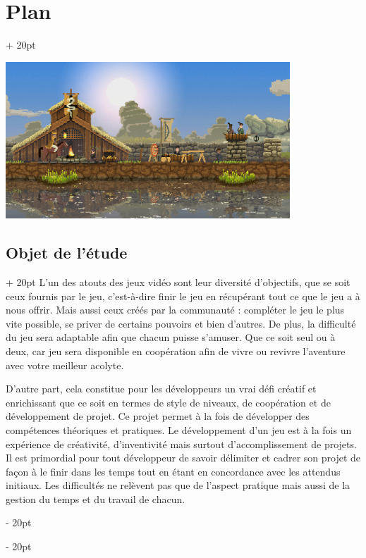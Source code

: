 \documentclass[a4paper, 12pt, twoside]{article}
\newcommand{\ind}[1][20pt]{\advance\leftskip + #1}
\newcommand{\deind}[1][20pt]{\advance\leftskip - #1}
\newenvironment{indt}[2][20pt]{#2 \par \ind[#1]}{\par \deind} %
\begin{document}
\begin{indt}{\section{Plan}}
        \begin{center}%
            \includegraphics[width=0.8\textwidth]{Kingdom.jpg}
        \end{center}

        \begin{indt}{\subsection{Objet de l'étude}}
            L'un des atouts des jeux vidéo sont leur diversité d'objectifs, que se soit ceux fournis par le jeu, c'est-à-dire finir le jeu en récupérant tout ce que le jeu a à nous offrir. Mais aussi ceux créés par la communauté : compléter le jeu le plus vite possible, se priver de certains pouvoirs et bien d'autres. De plus, la difficulté du jeu sera adaptable afin que chacun puisse s'amuser. Que ce soit seul ou à deux, car jeu sera disponible en coopération afin de vivre ou revivre l'aventure avec votre meilleur acolyte.

            D'autre part, cela constitue pour les développeurs un vrai défi créatif et enrichissant que ce soit en termes de style de niveaux, de coopération et de développement de projet. Ce projet permet à la fois de développer des compétences théoriques et pratiques. Le développement d'un jeu est à la fois un expérience de créativité, d'inventivité mais surtout d'accomplissement de projets. Il est primordial pour tout développeur de savoir délimiter et cadrer son projet de façon à le finir dans les temps tout en étant en concordance avec les attendus initiaux. Les difficultés ne relèvent pas que de l'aspect pratique mais aussi de la gestion du temps et du travail de chacun.
        \end{indt}



\end{indt}
\end{document}
